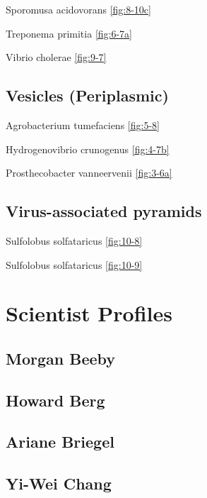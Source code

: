\documentclass[]{tufte-book}
\begin{document}
Sporomusa acidovorans \ref{fig:8-10c}

Treponema primitia \ref{fig:6-7a}

Vibrio cholerae \ref{fig:9-7}

\section{\texorpdfstring{\textbf{Vesicles
(Periplasmic)}}{Vesicles (Periplasmic)}}\label{vesicles-periplasmic}

Agrobacterium tumefaciens \ref{fig:5-8}

Hydrogenovibrio crunogenus \ref{fig:4-7b}

Prosthecobacter vanneervenii \ref{fig:3-6a}

\section{\texorpdfstring{\textbf{Virus-associated
pyramids}}{Virus-associated pyramids}}\label{virus-associated-pyramids}

Sulfolobus solfataricus \ref{fig:10-8}

Sulfolobus solfataricus \ref{fig:10-9}

\chapter{Scientist Profiles}\label{scientist-profiles}

\hypertarget{morgan_beeby}{\section{Morgan Beeby}\label{morgan_beeby}}

\hypertarget{howard_berg}{\section{Howard Berg}\label{howard_berg}}

\hypertarget{ariane_briegel}{\section{Ariane
Briegel}\label{ariane_briegel}}

\hypertarget{yi-wei_chang}{\section{Yi-Wei Chang}\label{yi-wei_chang}}
\end{document}
